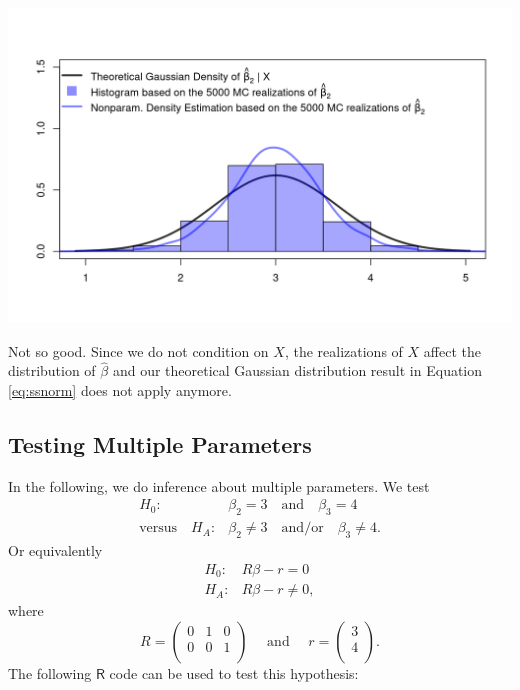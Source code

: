 \documentclass[
  14pt,
]{memoir}
\begin{document}
\begin{center}\includegraphics[width=1\textwidth]{figure/minimal-unnamed-chunk-73-1} \end{center}

Not so good. Since we do not condition on \(X\), the realizations of \(X\) affect the distribution of \(\hat\beta\) and our theoretical Gaussian distribution result in Equation \eqref{eq:ssnorm} does not apply anymore.

\hypertarget{testing-multiple-parameters}{%
\subsection{Testing Multiple Parameters}\label{testing-multiple-parameters}}

In the following, we do inference about multiple parameters. We test
\begin{align*}
H_0:&\beta_2=3\quad\text{and}\quad\beta_3=4\\
\text{versus}\quad H_A:&\beta_2\neq 3\quad\text{and/or}\quad\beta_3\neq 4.
\end{align*}
Or equivalently
\begin{align*}
H_0:&R\beta -r = 0 \\
H_A:&R\beta -r \neq 0,
\end{align*}
where
\[
R=\left(
\begin{matrix}
0&1&0\\
0&0&1\\
\end{matrix}\right)\quad\text{ and }\quad 
r=\left(\begin{matrix}3\\4\\\end{matrix}\right).
\]
The following \(\textsf{R}\) code can be used to test this hypothesis:
\end{document}
